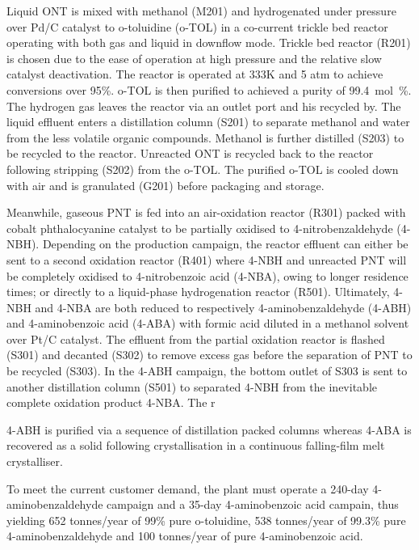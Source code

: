 Liquid ONT is mixed with methanol (M201) and hydrogenated under pressure over Pd/C catalyst to o-toluidine (o-TOL) in a co-current trickle bed reactor operating with both gas and liquid in downflow mode. Trickle bed reactor (R201) is chosen due to the ease of operation at high pressure and the relative slow catalyst deactivation. The reactor is operated at 333K and 5 atm to achieve conversions over 95\%. o-TOL is then purified to achieved a purity of \SI{99.4}{mol\percent}. The hydrogen gas leaves the reactor via an outlet port and his recycled by. The liquid effluent enters a distillation column (S201) to separate methanol and water from the less volatile organic compounds. Methanol is further distilled (S203) to be recycled to the reactor. Unreacted ONT is recycled back to the reactor following stripping (S202) from the o-TOL. The purified o-TOL is cooled down with air and is granulated (G201) before packaging and storage.

Meanwhile, gaseous PNT is fed into an air-oxidation reactor (R301) packed with cobalt phthalocyanine catalyst to be partially oxidised to 4-nitrobenzaldehyde (4-NBH). Depending on the production campaign, the reactor effluent can either be sent to a second oxidation reactor (R401) where 4-NBH and unreacted PNT will be completely oxidised to 4-nitrobenzoic acid (4-NBA), owing to longer residence times; or directly to a liquid-phase hydrogenation reactor (R501). Ultimately, 4-NBH and 4-NBA are both reduced to respectively 4-aminobenzaldehyde (4-ABH) and 4-aminobenzoic acid (4-ABA) with formic acid diluted in a methanol solvent over Pt/C catalyst. The effluent from the partial oxidation reactor is flashed (S301) and decanted (S302) to remove excess gas before the separation of PNT to be recycled (S303). 
In the 4-ABH campaign, the bottom outlet of S303 is sent to another distillation column (S501) to separated 4-NBH from the inevitable complete oxidation product 4-NBA. The r

4-ABH is purified via a sequence of distillation packed columns whereas 4-ABA is recovered as a solid following  crystallisation in a continuous falling-film melt crystalliser.

 To meet the current customer demand, the plant must operate a 240-day 4-aminobenzaldehyde campaign and a 35-day 4-aminobenzoic acid campain, thus yielding 652 tonnes/year of 99\% pure o-toluidine, 538 tonnes/year of 99.3\% pure 4-aminobenzaldehyde and 100 tonnes/year of pure 4-aminobenzoic acid.